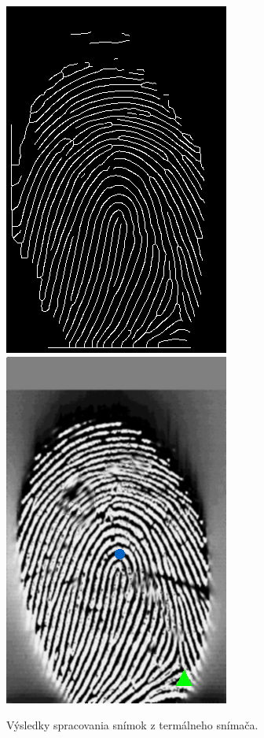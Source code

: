 \begin{figure}[h]
    \includegraphics[width=0.25\linewidth]{obrazky-figures/eval_results/termal_thin.png}\hspace{0.02\linewidth}
    \includegraphics[width=0.25\linewidth]{obrazky-figures/eval_results/termal_singularities.png}
    \caption{Výsledky spracovania snímok z termálneho snímača.}
    \label{obr:vyhodnotenie_termal}
  \end{figure}

